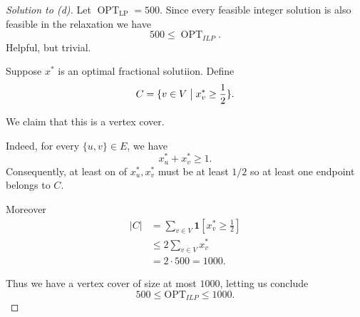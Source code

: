 \documentclass[11pt]{article}
\begin{document}
\begin{proof}[Solution to (d)]
    Let $\operatorname{OPT}_{\text{LP}} = 500$. 
    Since every feasible integer solution is 
    also feasible in the relaxation we have 
    \[
        500 \leq \operatorname{OPT}_{ILP}. 
    \]
    Helpful, but trivial. 

    Suppose $x^*$ is an optimal fractional 
    solutiion. Define 
    \[
        C = \{v\in V \bigm| x^*_v \geq \frac12\}. 
    \]

    We claim that this is a vertex cover. 

    Indeed, for every $\{u,v\} \in E$, we have 
    \[
        x^*_u + x^*_v \geq 1. 
    \]
    Consequently, at least on of $x^*_u, x^*_v$ 
    must be at least $1/2$ so 
    at least one endpoint belongs to $C$. 

    Moreover 
    \[
        \begin{aligned}
        |C|
        &=\sum_{v\in V}\mathbf1[x_v^*\geq\tfrac12]\\
        &\leq2\sum_{v\in V}x_v^*\\
        &=2\cdot500=1000.
        \end{aligned}
    \]

    Thus we have a vertex cover of size at most $1000$, 
    letting us conclude 
    \[
        500\leq\mathrm{OPT}_{ILP}\leq1000.
    \]
\end{proof}
\end{document}
